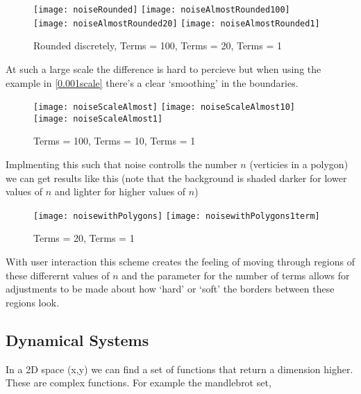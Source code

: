 \begin{figure}[H]
\centering
\texttt{[image: noiseRounded]}
\hspace{0.2cm}
\texttt{[image: noiseAlmostRounded100]}
\hspace{0.2cm}
\texttt{[image: noiseAlmostRounded20]}
\hspace{0.2cm}
\texttt{[image: noiseAlmostRounded1]}
\caption{Rounded discretely, Terms = 100, Terms = 20, Terms = 1}
\end{figure}

At such a large scale the difference is hard to percieve but when using the
example in \autoref{0.001scale} there's a clear `smoothing' in the boundaries.

\begin{figure}[H]
\centering
\texttt{[image: noiseScaleAlmost]}
\hspace{0.2cm}
\texttt{[image: noiseScaleAlmost10]}
\hspace{0.2cm}
\texttt{[image: noiseScaleAlmost1]}
\caption{Terms = 100, Terms = 10, Terms = 1}
\end{figure}

Implmenting this such that noise controlls the number $n$ (verticies in a
polygon) we can get results like this (note that the background is shaded darker
for lower values of $n$ and lighter for higher values of $n$)
\begin{figure}[H]
\centering
\texttt{[image: noisewithPolygons]}
\hspace{0.2cm}
\texttt{[image: noisewithPolygons1term]}
\caption{Terms = 20, Terms = 1}
\end{figure}

With user interaction this scheme creates the feeling of moving through regions
of these differernt values of $n$ and the parameter for the number of terms
allows for adjustments to be made about how `hard' or `soft' the borders between
these regions look.

\subsection{Dynamical Systems}
In a 2D space (x,y) we can find a set of functions that return a dimension
higher. These are complex functions. For example the mandlebrot set, 
